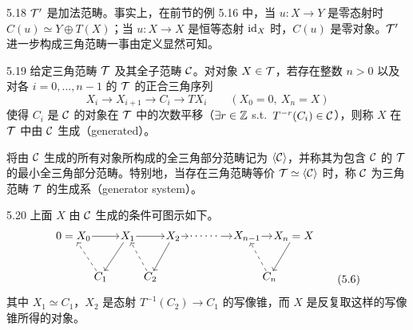\begin{remark}{5.18}
$\mathcal{T}'$ 是加法范畴。事实上，在前节的例 5.16 中，当 $u\colon X\to Y$ 是零态射时 $C(u)\simeq Y\oplus T(X)$；当 $u\colon X\to X$ 是恒等态射 $\mathrm{id}_X$ 时，$C(u)$ 是零对象。$\mathcal{T}'$ 进一步构成三角范畴一事由定义显然可知。
\end{remark}

\begin{definition}{5.19}
给定三角范畴 $\mathcal{T}$ 及其全子范畴 $\mathcal{C}$。对对象 $X\in\mathcal{T}$，若存在整数 $n>0$ 以及对各 $i=0,\dots,n-1$ 的 $\mathcal{T}$ 的正合三角序列
\[
X_i\longrightarrow X_{i+1}\longrightarrow C_i\longrightarrow TX_i \qquad (X_0=0,\ X_n=X)
\]
使得 $C_i$ 是 $\mathcal{C}$ 的对象在 $\mathcal{T}$ 中的次数平移（$\exists r\in\mathbb{Z}$ s.t.\ $T^{-r}(C_i)\in\mathcal{C}$），则称 $X$ 在 $\mathcal{T}$ 中由 $\mathcal{C}$ 生成（generated）。
\end{definition}


将由 $\mathcal{C}$ 生成的所有对象所构成的全三角部分范畴记为 $\langle\mathcal{C}\rangle$，并称其为包含 $\mathcal{C}$ 的 $\mathcal{T}$ 的最小全三角部分范畴。特别地，当存在三角范畴等价 $\mathcal{T}\simeq\langle\mathcal{C}\rangle$ 时，称 $\mathcal{C}$ 为三角范畴 $\mathcal{T}$ 的生成系（generator system）。

\begin{remark}{5.20}
上面 $X$ 由 $\mathcal{C}$ 生成的条件可图示如下。
\begin{equation}
\begin{tikzpicture}[scale=0.95, every node/.style={inner sep=1pt}]
\node (X0) at (0,0) {$0=X_0$};
\node (X1) at (1.80,0) {$X_1$};
\node (X2) at (3.30,0) {$X_2$};
\node (D)  at (4.35,0) {$\cdots\cdots$};
\node (Xn1) at (5.75,0) {$X_{n-1}$};
\node (Xn) at (7.30,0) {$X_n=X$};
\node (C1) at (0.90,-1.35) {$C_1$};
\node (C2) at (2.55,-1.35) {$C_2$};
\node (Cn) at (6.50,-1.35) {$C_n$};
\draw[->] (X0) -- (X1);
\draw[->] (X1) -- (X2);
\draw[->] (X2) -- (D);
\draw[->] (D) -- (Xn1);
\draw[->] (Xn1) -- (Xn);
\draw[->,dashed] (C1) -- (X0);
\draw[->] (X1) -- (C1);
\draw[->,dashed] (C2) -- (X1);
\draw[->] (X2) -- (C2);
\draw[->,dashed] (Cn) -- (Xn1);
\draw[->] (Xn) -- (Cn);
\end{tikzpicture} \tag{5.6}
\end{equation}
其中 $X_1\simeq C_1$，$X_2$ 是态射 $T^{-1}(C_2)\to C_1$ 的写像锥，而 $X$ 是反复取这样的写像锥所得的对象。
\end{remark}

